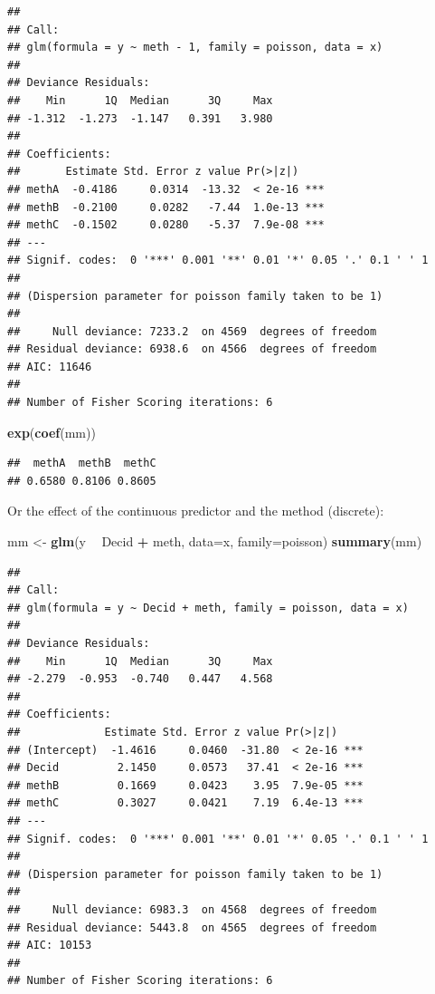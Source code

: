 \documentclass[12pt,]{book}
\newenvironment{Shaded}{\begin{snugshade}}{\end{snugshade}}
\newcommand{\DataTypeTok}[1]{\textcolor[rgb]{0.13,0.29,0.53}{#1}}
\newcommand{\KeywordTok}[1]{\textcolor[rgb]{0.13,0.29,0.53}{\textbf{#1}}}
\newcommand{\NormalTok}[1]{#1}
\newcommand{\OperatorTok}[1]{\textcolor[rgb]{0.81,0.36,0.00}{\textbf{#1}}}
\newcommand{\StringTok}[1]{\textcolor[rgb]{0.31,0.60,0.02}{#1}}
\begin{document}
\begin{verbatim}
## 
## Call:
## glm(formula = y ~ meth - 1, family = poisson, data = x)
## 
## Deviance Residuals: 
##    Min      1Q  Median      3Q     Max  
## -1.312  -1.273  -1.147   0.391   3.980  
## 
## Coefficients:
##       Estimate Std. Error z value Pr(>|z|)    
## methA  -0.4186     0.0314  -13.32  < 2e-16 ***
## methB  -0.2100     0.0282   -7.44  1.0e-13 ***
## methC  -0.1502     0.0280   -5.37  7.9e-08 ***
## ---
## Signif. codes:  0 '***' 0.001 '**' 0.01 '*' 0.05 '.' 0.1 ' ' 1
## 
## (Dispersion parameter for poisson family taken to be 1)
## 
##     Null deviance: 7233.2  on 4569  degrees of freedom
## Residual deviance: 6938.6  on 4566  degrees of freedom
## AIC: 11646
## 
## Number of Fisher Scoring iterations: 6
\end{verbatim}

\begin{Shaded}
\begin{Highlighting}[]
\KeywordTok{exp}\NormalTok{(}\KeywordTok{coef}\NormalTok{(mm))}
\end{Highlighting}
\end{Shaded}

\begin{verbatim}
##  methA  methB  methC 
## 0.6580 0.8106 0.8605
\end{verbatim}

Or the effect of the continuous predictor and the method (discrete):

\begin{Shaded}
\begin{Highlighting}[]
\NormalTok{mm <-}\StringTok{ }\KeywordTok{glm}\NormalTok{(y }\OperatorTok{~}\StringTok{ }\NormalTok{Decid }\OperatorTok{+}\StringTok{ }\NormalTok{meth, }\DataTypeTok{data=}\NormalTok{x, }\DataTypeTok{family=}\NormalTok{poisson)}
\KeywordTok{summary}\NormalTok{(mm)}
\end{Highlighting}
\end{Shaded}

\begin{verbatim}
## 
## Call:
## glm(formula = y ~ Decid + meth, family = poisson, data = x)
## 
## Deviance Residuals: 
##    Min      1Q  Median      3Q     Max  
## -2.279  -0.953  -0.740   0.447   4.568  
## 
## Coefficients:
##             Estimate Std. Error z value Pr(>|z|)    
## (Intercept)  -1.4616     0.0460  -31.80  < 2e-16 ***
## Decid         2.1450     0.0573   37.41  < 2e-16 ***
## methB         0.1669     0.0423    3.95  7.9e-05 ***
## methC         0.3027     0.0421    7.19  6.4e-13 ***
## ---
## Signif. codes:  0 '***' 0.001 '**' 0.01 '*' 0.05 '.' 0.1 ' ' 1
## 
## (Dispersion parameter for poisson family taken to be 1)
## 
##     Null deviance: 6983.3  on 4568  degrees of freedom
## Residual deviance: 5443.8  on 4565  degrees of freedom
## AIC: 10153
## 
## Number of Fisher Scoring iterations: 6
\end{verbatim}
\end{document}
